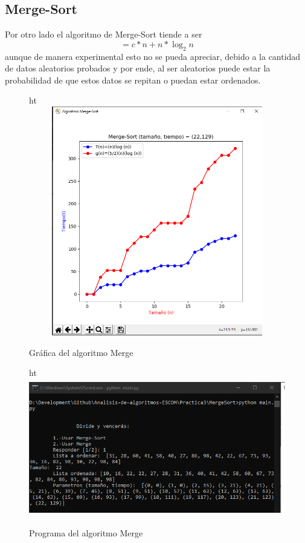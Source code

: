 \documentclass[12pt,twoside]{article}
\begin{document}
\subsection{Merge-Sort}
Por otro lado el algoritmo de Merge-Sort tiende a ser \begin{equation}
    =c*n+n*\log_{2} n
\end{equation} aunque de manera experimental esto no se pueda apreciar, debido a la cantidad de datos aleatorios probados y por ende, al ser aleatorios puede estar la probabilidad de que estos datos se repitan o puedan estar ordenados.
\begin{figure}{ht}
    \centering
    \includegraphics[width=13cm, height=10cm]{mergesort-graph.png}
    \caption{Gr\'afica del algoritmo Merge}
    \label{fig:mergesort_graph}
\end{figure}


\begin{figure}{ht}
    \centering
    \includegraphics[width=13cm, height=6cm]{mergesort-program.png}
    \caption{Programa del algoritmo Merge}
    \label{fig:mergesort_program}
\end{figure}
\end{document}
